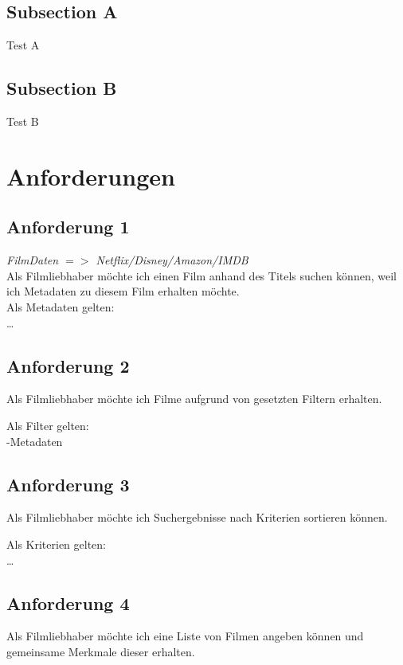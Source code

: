 \documentclass[conference]{IEEEtran}
\begin{document}
\subsection{Subsection A}

Test A

\subsection{Subsection B}

Test B

\section{Anforderungen}

\subsection{Anforderung 1}
\textit{FilmDaten $=>$ Netflix/Disney/Amazon/IMDB} 
\\
Als Filmliebhaber möchte ich einen Film anhand des Titels suchen können,
weil ich Metadaten zu diesem Film erhalten möchte.
\\
Als Metadaten gelten:
\\
\dots

\subsection{Anforderung 2}

Als Filmliebhaber möchte ich Filme aufgrund von gesetzten Filtern erhalten.

Als Filter gelten:
\\
-Metadaten

\subsection{Anforderung 3}

Als Filmliebhaber möchte ich Suchergebnisse nach Kriterien sortieren können.

Als Kriterien gelten:
\\
\dots
\\

\subsection{Anforderung 4}

Als Filmliebhaber möchte ich eine Liste von Filmen angeben können
und gemeinsame Merkmale dieser erhalten.
\end{document}
